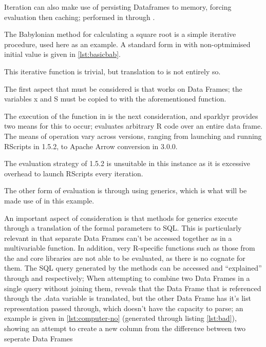 Iteration can also make use of persisting  Dataframes to memory,
forcing evaluation then caching; performed in  through
.

The Babylonian method for calculating a square root is a simple
iterative procedure, used here as an example. A standard form in \R with
non-optmimised initial value is given in \cref{lst:basicbab}.



This iterative function is trivial, but translation to  is not
entirely so.

The first aspect that must be considered is that  works on 
Data Frames; the variables x and S must be copied to  with the
aforementioned 
function.

The execution of the function in  is the next consideration, and
sparklyr provides two means for this to occur;
 evaluates arbitrary R
code over an entire data frame. The means of operation vary across 
versions, ranging from launching and running RScripts in  1.5.2, to
Apache Arrow conversion in  3.0.0.

The evaluation strategy of 1.5.2 is unsuitable in this instance as it is
excessive overhead to launch RScripts every iteration.

The other form of evaluation is through using  generics, which is
what will be made use of in this example.

An important aspect of consideration is that  methods for 
generics execute through a translation of the formal parameters to 
SQL. This is particularly relevant in that separate  Data Frames
can't be accessed together as in a multivariable function. In addition,
very R-specific functions such as those from the  and
 core libraries are not able to be evaluated, as there is
no  cognate for them. The SQL query generated by the methods
can be accessed and ``explained'' through
 and
 respectively; When attempting
to combine two  Data Frames in a single query without joining them,
 reveals that the Data
Frame that is referenced through the .data variable is
translated, but the other Data Frame has it's list representation passed
through, which  doesn't have the capacity to parse; an example
is given in \cref{lst:computer-no} (generated through listing
\cref{lst:bad}), showing an attempt to create a new column from the
difference between two seperate Data Frames

